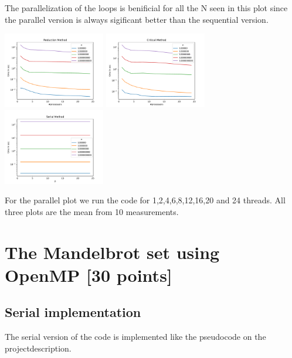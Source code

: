 \documentclass[unicode,11pt,a4paper,oneside,numbers=endperiod,openany]{scrartcl}
\begin{document}
The parallelization of the loops is benificial for all the N seen in this plot since the parallel version is always sigificant better than the sequential version.

\includegraphics[width=0.3333\textwidth]{../results/perf_scaling_reduction.pdf}
\includegraphics[width=0.3333\textwidth]{../results/perf_scaling_critical.pdf}
\includegraphics[width=0.3333\textwidth]{../results/perf_scaling_serial.pdf}

For the parallel plot we run the code for 1,2,4,6,8,12,16,20 and 24 threads. All three plots are the mean from 10 measurements.


\section{The Mandelbrot set using OpenMP [30 points]}

\subsection{Serial implementation}
The serial version of the code is implemented like the pseudocode on the projectdescription.
\end{document}

